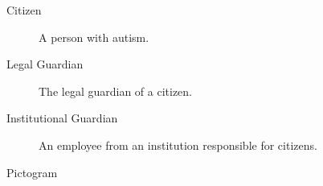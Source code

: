 \begin{description}
\item[Citizen] A person with autism.
\item[Legal Guardian] The legal guardian of a citizen.
\item[Institutional Guardian] An employee from an institution responsible for citizens.
\item[Pictogram] 
\end{description}